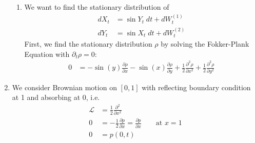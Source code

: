 \documentclass[12pt]{article}
\theoremstyle{plain}
\theoremstyle{definition}
\theoremstyle{remark}
\begin{document}
\begin{enumerate}
\begin{enumerate}
      \item %
        We want to find the stationary distribution of
        \begin{align*}
          dX_t &= \sin Y_t \; dt + dW_t^{(1)} \\
          dY_t &= \sin X_t \; dt + dW_t^{(2)}
        \end{align*}
        First, we find the stationary distribution $\rho$ by solving the
        Fokker-Plank Equation with $\partial_t \rho=0$:
        \begin{align*}
          0 &=
          - \sin(y) \frac{\partial \rho}{\partial x}
          - \sin(x) \frac{\partial \rho}{\partial y}
          + \frac{1}{2}\frac{\partial^2 \rho}{\partial x^2}
          + \frac{1}{2}\frac{\partial^2 \rho}{\partial y^2}
        \end{align*}
    \end{enumerate}


  \item %
    We consider Brownian motion on $[0,1]$ with reflecting boundary
    condition at 1 and absorbing at 0, i.e.
    \begin{align*}
      \mathscr{L} &= \frac{1}{2} \frac{\partial^2}{\partial x^2}\\
      0
      &= -\frac{1}{2} \frac{\partial p}{\partial x}
      = \frac{\partial p}{\partial x}
      \qquad \text{at $x=1$}\\
      0 &= p(0,t)
    \end{align*}


\end{enumerate}
\end{document}
